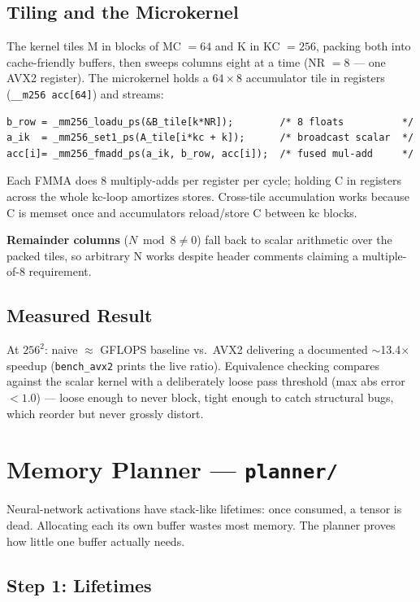 \documentclass[11pt,a4paper]{article}
\begin{document}
\subsection{Tiling and the Microkernel}

The kernel tiles M in blocks of MC $=64$ and K in KC $=256$, packing both into
cache-friendly buffers, then sweeps columns eight at a time (NR $=8$ --- one AVX2
register). The microkernel holds a $64 \times 8$ accumulator tile in registers
(\texttt{\_\_m256 acc[64]}) and streams:

\begin{lstlisting}[style=cstyle]
b_row = _mm256_loadu_ps(&B_tile[k*NR]);        /* 8 floats          */
a_ik  = _mm256_set1_ps(A_tile[i*kc + k]);      /* broadcast scalar  */
acc[i]= _mm256_fmadd_ps(a_ik, b_row, acc[i]);  /* fused mul-add     */
\end{lstlisting}

Each FMMA does 8 multiply-adds per register per cycle; holding C in registers
across the whole kc-loop amortizes stores. Cross-tile accumulation works because
C is memset once and accumulators reload/store C between kc blocks.

\textbf{Remainder columns} ($N \bmod 8 \neq 0$) fall back to scalar arithmetic
over the packed tiles, so arbitrary N works despite header comments claiming a
multiple-of-8 requirement.

\subsection{Measured Result}

At $256^2$: naive $\approx$ GFLOPS baseline vs.\ AVX2 delivering a documented
$\sim$13.4$\times$ speedup (\texttt{bench\_avx2} prints the live ratio).
Equivalence checking compares against the scalar kernel with a deliberately
loose pass threshold (max abs error $< 1.0$) --- loose enough to never block,
tight enough to catch structural bugs, which reorder but never grossly distort.

\section{Memory Planner --- \texttt{planner/}}

Neural-network activations have stack-like lifetimes: once consumed, a tensor is
dead. Allocating each its own buffer wastes most memory. The planner proves how
little one buffer actually needs.

\subsection{Step 1: Lifetimes}
\end{document}

